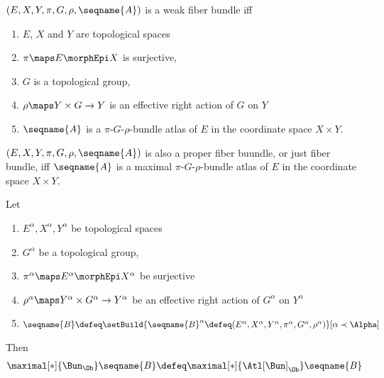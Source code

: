\documentclass{article}
\begin{document}
\begin{definition}
\label{def:Bun}
$(E, X, Y, \pi, G, \rho, \seqname{A})$ is a weak fiber bundle iff

\begin{enumerate}
\item
$E$, $X$ and $Y$ are topological spaces

\item
$\pi \maps E \morphEpi X$ is surjective,

\item
$G$ is a topological group,

\item
$\rho \maps Y \times G \to Y$ is an effective right action of $G$ on $Y$

\item
$\seqname{A}$ is a $\pi$-$G$-$\rho$-bundle atlas of $E$ in the
coordinate space $X \times Y$.
\end{enumerate}

$(E, X, Y, \pi, G, \rho, \seqname{A})$ is also a proper fiber buundle,
or just fiber bundle, iff $\seqname{A}$ is a maximal
$\pi$-$G$-$\rho$-bundle atlas of $E$ in the coordinate space $X \times
Y$.

Let \\
\begin{enumerate}
\item
$E^\alpha, X^\alpha, Y^\alpha$ be topological spaces

\item
$G^\alpha$ be a topological group,

\item
$\pi^\alpha \maps E^\alpha \morphEpi X^\alpha$ be surjective

\item
$\rho^\alpha \maps Y^\alpha \times G^\alpha \to Y^\alpha$ be an
effective right action of $G^\alpha$ on $Y^\alpha$

\item
$
  \seqname{B}
  \defeq
  \setBuild
    {{
      \seqname{B}^\alpha \defeq
      (
        E^\alpha,
        X^\alpha,
        Y^\alpha,
        \pi^\alpha,
        G^\alpha,
        \rho^\alpha
      )
    }}%
    [
      \alpha \prec \Alpha
    ]
$
\end{enumerate}

Then
\begin{multline}
\maximal[*]{\Bun_\Ob} \seqname{B} \defeq
\maximal[*]{\Atl[\Bun]_\Ob} \seqname{B}
\end{multline}
\end{definition}
\end{document}
